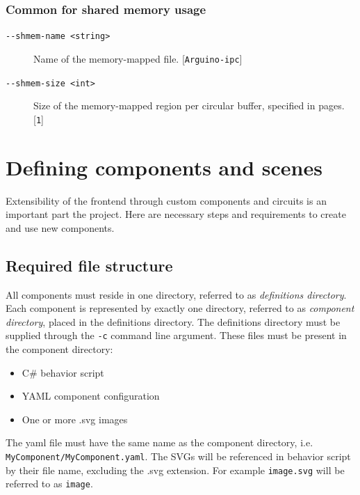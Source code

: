 \subsubsection{Common for shared memory usage}
\begin{description}
    \item[\texttt{-{}-shmem-name <string>}] Name of the memory-mapped file. [\texttt{Arguino-ipc}]
    \item[\texttt{-{}-shmem-size <int>}] Size of the memory-mapped region per circular buffer, specified in pages.{\footnotemark} [\texttt{1}]
\end{description}


\section{Defining components and scenes} \label{sec:component_spec}
Extensibility of the frontend through custom components and circuits is an important part the project. Here are necessary steps and requirements to create and use new components.

\subsection{Required file structure}
All components must reside in one directory, referred to as \textit{definitions directory}. Each component is represented by exactly one directory, referred to as \textit{component directory}, placed in the definitions directory. The definitions directory must be supplied through the \texttt{-c} command line argument. These files must be present in the component directory:

\begin{itemize}
    \item C\# behavior script
    \item YAML component configuration
    \item One or more .svg images
\end{itemize}

The yaml file must have the same name as the component directory, i.e. \texttt{MyComponent/MyComponent.yaml}. The SVGs will be referenced in behavior script by their file name, excluding the .svg extension. For example \texttt{image.svg} will be referred to as \texttt{image}.

